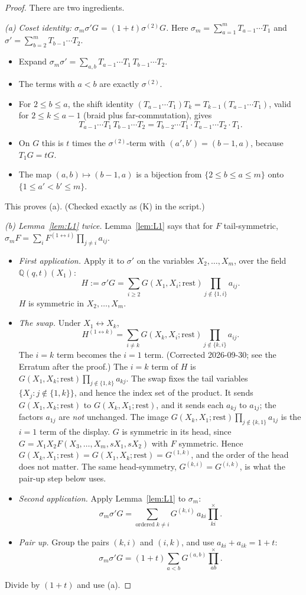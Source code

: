 \documentclass[11pt]{amsart}
\theoremstyle{remark}
\newcommand{\cross}{\textstyle\prod^{\times}}
\begin{document}
\begin{proof}
There are two ingredients.

\emph{(a) Coset identity: $\sigma_m\sigma'G = (1+t)\sigma^{(2)}G$.} Here $\sigma_m = \sum_{a=1}^mT_{a-1}\cdots T_1$ and $\sigma' = \sum_{b=2}^mT_{b-1}\cdots T_2$.
\begin{itemize}
\item Expand $\sigma_m\sigma' = \sum_{a,b}T_{a-1}\cdots T_1\,T_{b-1}\cdots T_2$.
\item The terms with $a<b$ are exactly $\sigma^{(2)}$.
\item For $2\le b\le a$, the shift identity $(T_{a-1}\cdots T_1)T_k = T_{k-1}(T_{a-1}\cdots T_1)$, valid for $2\le k\le a-1$ (braid plus far-commutation), gives
\[
T_{a-1}\cdots T_1\,T_{b-1}\cdots T_2 = T_{b-2}\cdots T_1\cdot T_{a-1}\cdots T_2\cdot T_1.
\]
\item On $G$ this is $t$ times the $\sigma^{(2)}$-term with $(a',b') = (b-1,a)$, because $T_1G = tG$.
\item The map $(a,b)\mapsto(b-1,a)$ is a bijection from $\{2\le b\le a\le m\}$ onto $\{1\le a'<b'\le m\}$.
\end{itemize}
This proves (a). (Checked exactly as (K) in the script.)

\emph{(b) Lemma~\ref{lem:L1} twice.} Lemma~\ref{lem:L1} says that for $F$ tail-symmetric, $\sigma_mF = \sum_iF^{(1\leftrightarrow i)}\prod_{j\ne i}a_{ij}$.
\begin{itemize}
\item \emph{First application.} Apply it to $\sigma'$ on the variables $X_2,\dots,X_m$, over the field $\mathbb{Q}(q,t)(X_1)$:
\[
H := \sigma'G = \sum_{i\ge2}G(X_1,X_i;\text{rest})\prod_{j\notin\{1,i\}}a_{ij}.
\]
$H$ is symmetric in $X_2,\dots,X_m$.
\item \emph{The swap.} Under $X_1\leftrightarrow X_k$,
\[
H^{(1\leftrightarrow k)} = \sum_{i\ne k}G(X_k,X_i;\text{rest})\prod_{j\notin\{k,i\}}a_{ij}.
\]
The $i=k$ term becomes the $i=1$ term. (Corrected 2026-09-30; see the Erratum after the proof.) The $i=k$ term of $H$ is $G(X_1,X_k;\text{rest})\prod_{j\notin\{1,k\}}a_{kj}$. The swap fixes the tail variables $\{X_j:j\notin\{1,k\}\}$, and hence the index set of the product. It sends $G(X_1,X_k;\text{rest})$ to $G(X_k,X_1;\text{rest})$, and it sends each $a_{kj}$ to $a_{1j}$; the factors $a_{1j}$ are \emph{not} unchanged. The image $G(X_k,X_1;\text{rest})\prod_{j\notin\{k,1\}}a_{1j}$ is the $i=1$ term of the display. $G$ is symmetric in its head, since $G=X_1X_2F(X_3,\dots,X_m,sX_1,sX_2)$ with $F$ symmetric. Hence $G(X_k,X_1;\text{rest})=G(X_1,X_k;\text{rest})=G^{(1,k)}$, and the order of the head does not matter. The same head-symmetry, $G^{(k,i)}=G^{(i,k)}$, is what the pair-up step below uses.
\item \emph{Second application.} Apply Lemma~\ref{lem:L1} to $\sigma_m$:
\[
\sigma_m\sigma'G = \sum_{\text{ordered }k\ne i}G^{(k,i)}\,a_{ki}\cross_{ki}.
\]
\item \emph{Pair up.} Group the pairs $(k,i)$ and $(i,k)$, and use $a_{ki}+a_{ik} = 1+t$:
\[
\sigma_m\sigma'G = (1+t)\sum_{a<b}G^{(a,b)}\cross_{ab}.
\]
\end{itemize}
Divide by $(1+t)$ and use (a).
\end{proof}
\end{document}
